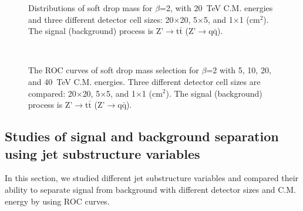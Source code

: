 \documentclass[12pt,twoside,a4paper,an,final]{cms-tdr}
\begin{document}
\begin{figure}
\begin{center}
\end{center}
\caption{
Distributions of soft drop mass for $\beta$=2, with 20~TeV C.M. energies and three different detector cell sizes: 20$\times$20, 
5$\times$5, and 1$\times$1 ($\mathrm{cm}^{2}$). The signal (background) process is 
Z'$\rightarrow$t$\bar{\mathrm{t}}$ (Z'$\rightarrow$q$\bar{\mathrm{q}}$).
}
\label{fig:cluster_mass_sdb2_tt}
\end{figure}


\begin{figure}
\begin{center}
  \\
\end{center}
\caption{
The ROC curves of soft drop mass selection for $\beta$=2
with 5, 10, 20, and 40~TeV C.M. energies. 
Three different detector cell sizes are compared: 20$\times$20, 
5$\times$5, and 1$\times$1 ($\mathrm{cm}^{2}$). 
The signal (background) process is Z'$\rightarrow$t$\bar{\mathrm{t}}$
(Z'$\rightarrow$q$\bar{\mathrm{q}}$).
}
\label{fig:cluster_mass_sdb2_tt_ROC}
\end{figure}
\subsection{Studies of signal and background separation using jet substructure variables}
In this section, we studied different jet substructure variables and compared their ability to separate signal from background with different detector sizes and C.M. energy by using ROC curves.\\
\end{document}
